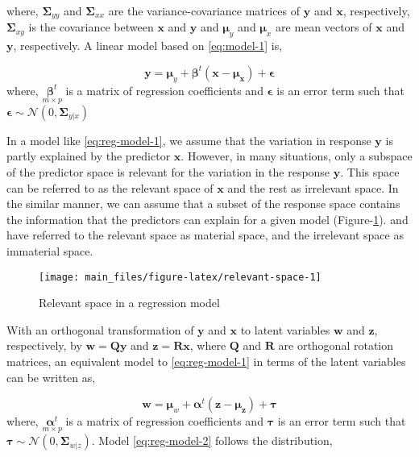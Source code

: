 \documentclass[12pt,3p,authoryear]{elsarticle}
\begin{document}
where, \(\boldsymbol{\Sigma}_{yy}\) and \(\boldsymbol{\Sigma}_{xx}\) are
the variance-covariance matrices of \(\mathbf{y}\) and \(\mathbf{x}\),
respectively, \(\boldsymbol{\Sigma}_{xy}\) is the covariance between
\(\mathbf{x}\) and \(\mathbf{y}\) and \(\boldsymbol{\mu}_y\) and
\(\boldsymbol{\mu}_x\) are mean vectors of \(\mathbf{x}\) and
\(\mathbf{y}\), respectively. A linear model based on \eqref{eq:model-1}
is,

\begin{equation}
\mathbf{y} = \boldsymbol{\mu}_y + 
  \boldsymbol{\beta}^t(\mathbf{x} - \boldsymbol{\mu_x}) + 
  \boldsymbol{\epsilon}
\label{eq:reg-model-1}
\end{equation} where, \(\underset{m\times p}{\boldsymbol{\beta}^t}\) is
a matrix of regression coefficients and \(\boldsymbol{\epsilon}\) is an
error term such that
\(\boldsymbol{\epsilon} \sim \mathcal{N}(0, \boldsymbol{\Sigma}_{y|x})\)

In a model like \eqref{eq:reg-model-1}, we assume that the variation in
response \(\mathbf{y}\) is partly explained by the predictor
\(\mathbf{x}\). However, in many situations, only a subspace of the
predictor space is relevant for the variation in the response
\(\mathbf{y}\). This space can be referred to as the relevant space of
\(\mathbf{x}\) and the rest as irrelevant space. In the similar manner,
we can assume that a subset of the response space contains the
information that the predictors can explain for a given model
(Figure-\ref{fig:relevant-space}). \citet{cook2010envelope} and
\citet{cook2015simultaneous} have referred to the relevant space as
material space, and the irrelevant space as immaterial space.

\begin{figure}

{\centering \texttt{[image: main\_files/figure-latex/relevant-space-1]} 

}

\caption{Relevant space in a regression model}\label{fig:relevant-space}
\end{figure}

With an orthogonal transformation of \(\mathbf{y}\) and \(\mathbf{x}\)
to latent variables \(\mathbf{w}\) and \(\mathbf{z}\), respectively, by
\(\mathbf{w=Qy}\) and \(\mathbf{z = Rx}\), where \(\mathbf{Q}\) and
\(\mathbf{R}\) are orthogonal rotation matrices, an equivalent model to
\eqref{eq:reg-model-1} in terms of the latent variables can be written as,

\begin{equation}
\mathbf{w} = \boldsymbol{\mu}_w + \boldsymbol{\alpha}^t(\mathbf{z} - \boldsymbol{\mu_z}) + \boldsymbol{\tau}
\label{eq:reg-model-2}
\end{equation} where, \(\underset{m\times p}{\boldsymbol{\alpha}^t}\) is
a matrix of regression coefficients and \(\boldsymbol{\tau}\) is an
error term such that
\(\boldsymbol{\tau} \sim \mathcal{N}(0, \boldsymbol{\Sigma}_{w|z})\).
Model \eqref{eq:reg-model-2} follows the distribution,
\end{document}

